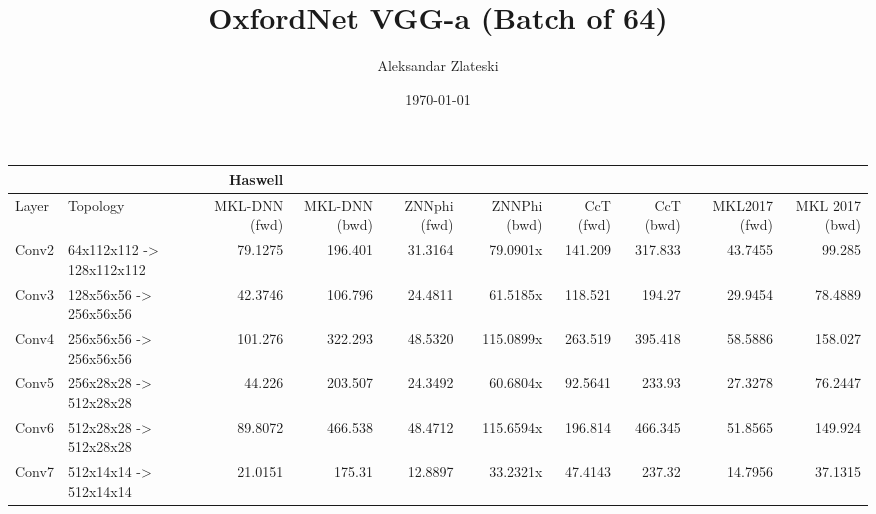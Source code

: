 \documentclass[11pt]{article}
\title{OxfordNet VGG-a (Batch of 64)}
\author{Aleksandar Zlateski}
\date{\today}
\begin{document}
\maketitle

\setcounter{tocdepth}{3}
\tableofcontents
\vspace*{1cm}

\begin{center}
\begin{tabular}{llrrrrrrrr}
\hline
        &                              &        Haswell  &                 &                &                &             &             &                 &                  \\
\hline
 Layer  &  Topology                    &  MKL-DNN (fwd)  &  MKL-DNN (bwd)  &  ZNNphi (fwd)  &  ZNNPhi (bwd)  &  CcT (fwd)  &  CcT (bwd)  &  MKL2017 (fwd)  &  MKL 2017 (bwd)  \\
\hline
 Conv2  &  64x112x112  -> 128x112x112  &        79.1275  &        196.401  &       31.3164  &      79.0901x  &    141.209  &    317.833  &        43.7455  &          99.285  \\
 Conv3  &  128x56x56   -> 256x56x56    &        42.3746  &        106.796  &       24.4811  &      61.5185x  &    118.521  &     194.27  &        29.9454  &         78.4889  \\
 Conv4  &  256x56x56   -> 256x56x56    &        101.276  &        322.293  &       48.5320  &     115.0899x  &    263.519  &    395.418  &        58.5886  &         158.027  \\
 Conv5  &  256x28x28   -> 512x28x28    &         44.226  &        203.507  &       24.3492  &      60.6804x  &    92.5641  &     233.93  &        27.3278  &         76.2447  \\
 Conv6  &  512x28x28   -> 512x28x28    &        89.8072  &        466.538  &       48.4712  &     115.6594x  &    196.814  &    466.345  &        51.8565  &         149.924  \\
 Conv7  &  512x14x14   -> 512x14x14    &        21.0151  &         175.31  &       12.8897  &      33.2321x  &    47.4143  &     237.32  &        14.7956  &         37.1315  \\
\hline
\end{tabular}
\end{center}
\end{document}
